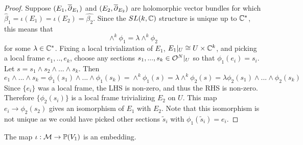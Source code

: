 	\begin{proof}
		 Suppose $(E_1, \overline{\partial}_{E_1})$ and $(E_2, \overline{\partial}_{E_2})$ are holomorphic vector bundles for which $\hat{\beta}_1 = \iota(E_1) = \iota(E_2) = \hat{\beta_2}$. Since the $SL(k,\mathbb{C})$ structure is unique up to $\mathbb{C}^\ast$, this means that
		\begin{equation}
		\wedge^k \phi_1 = \lambda \wedge^k \phi_2
		\end{equation}
		for some $\lambda \in \mathbb{C}^\ast$. Fixing a local trivialization of $E_1$, $E_1|_U \cong U\times \mathbb{C}^k$, and picking a local frame $e_1,..,e_k$, choose any sections $s_1,...,s_k \in \mathcal{O}^N|_{U}$ so that $\phi_1(e_i) = s_i$. Let $s = s_1 \wedge s_2 \wedge ... \wedge s_k$. Then
		\begin{equation}
		e_1\wedge...\wedge s_k=\phi_1(s_1)\wedge...\wedge \phi_1(s_k)= \wedge^k \phi_1(s) = \lambda \wedge^k \phi_2(s) = \lambda \phi_2(s_1)\wedge...\wedge \phi_2(s_k)
		\end{equation}
		Since $\{e_i\}$ was a local frame, the LHS is non-zero, and thus the RHS is non-zero. Therefore $\{\phi_2(s_i)\}$ is a local frame trivializing $E_2$ on $U$. This map $e_i \to \phi_2(s_2)$ gives an isomorphism of $E_1$ with $E_2$. Note that this isomorphism is not unique as we could have picked other sections $\tilde{s}_i$ with $\phi_1(\tilde{s}_i) = e_i$.
	\end{proof}
	\begin{theorem}
		\label{t:det-embed}
		The map $\iota:\mathcal{M} \to \mathbb{P}(V_1)$ is an embedding.
	\end{theorem}

